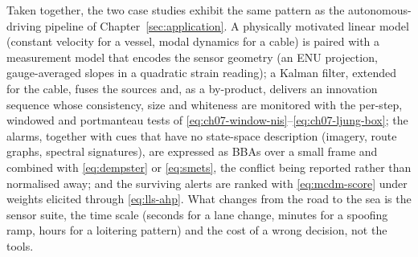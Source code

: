 \documentclass[graybox,envcountchap]{style/SNmono}
\begin{document}
Taken together, the two case studies exhibit the same pattern as the autonomous-driving pipeline of Chapter~\ref{sec:application}. A physically motivated linear model (constant velocity for a vessel, modal dynamics for a cable) is paired with a measurement model that encodes the sensor geometry (an ENU projection, gauge-averaged slopes in a quadratic strain reading); a Kalman filter, extended for the cable, fuses the sources and, as a by-product, delivers an innovation sequence whose consistency, size and whiteness are monitored with the per-step, windowed and portmanteau tests of \eqref{eq:ch07-window-nis}--\eqref{eq:ch07-ljung-box}; the alarms, together with cues that have no state-space description (imagery, route graphs, spectral signatures), are expressed as BBAs over a small frame and combined with \eqref{eq:dempster} or \eqref{eq:smets}, the conflict being reported rather than normalised away; and the surviving alerts are ranked with \eqref{eq:mcdm-score} under weights elicited through \eqref{eq:lls-ahp}. What changes from the road to the sea is the sensor suite, the time scale (seconds for a lane change, minutes for a spoofing ramp, hours for a loitering pattern) and the cost of a wrong decision, not the tools.
\end{document}
